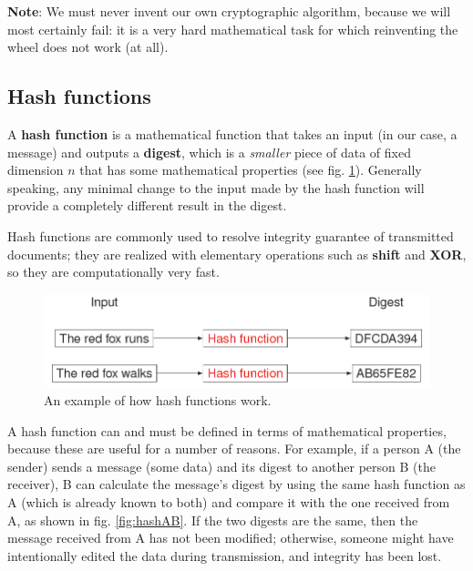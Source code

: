 \vspace{0.2em}

\textbf{Note}: We must never invent our own cryptographic algorithm, because we will most certainly fail: it is a very hard mathematical task for which reinventing the wheel does not work (at all).


\subsection{Hash functions}
A \textbf{hash function} is a mathematical function that takes an input (in our case, a message) and outputs a \textbf{digest}, which is a \textit{smaller} piece of data of fixed dimension $n$ that has some mathematical properties (see fig. \ref{fig:hash}). Generally speaking, any minimal change to the input made by the hash function will provide a completely different result in the digest.

Hash functions are commonly used to resolve integrity guarantee of transmitted documents; they are realized with elementary operations such as \textbf{shift} and \textbf{XOR}, so they are computationally very fast.

\begin{figure}[H]
\centering
\includegraphics[scale=0.5]{img/hash.png}
\decoRule
\caption{An example of how hash functions work.}
\label{fig:hash}
\end{figure}

A hash function can and must be defined in terms of mathematical properties, because these are useful for a number of reasons. For example, if a person A (the sender) sends a message (some data) and its digest to another person B (the receiver), B can calculate the message's digest by using the same hash function as A (which is already known to both) and compare it with the one received from A, as shown in fig. \ref{fig:hashAB}. If the two digests are the same, then the message received from A has not been modified; otherwise, someone might have intentionally edited the data during transmission, and integrity has been lost.

